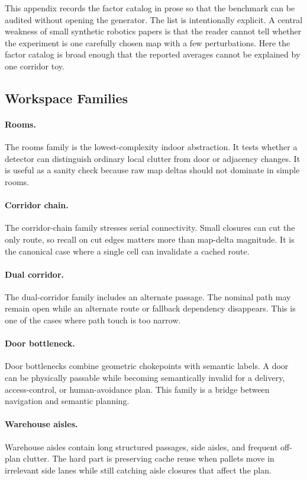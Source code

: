 \documentclass{article}
\begin{document}
This appendix records the factor catalog in prose so that the benchmark can be audited without opening the generator. The list is intentionally explicit. A central weakness of small synthetic robotics papers is that the reader cannot tell whether the experiment is one carefully chosen map with a few perturbations. Here the factor catalog is broad enough that the reported averages cannot be explained by one corridor toy.

\subsection{Workspace Families}

\paragraph{Rooms.}
The rooms family is the lowest-complexity indoor abstraction. It tests whether a detector can distinguish ordinary local clutter from door or adjacency changes. It is useful as a sanity check because raw map deltas should not dominate in simple rooms.

\paragraph{Corridor chain.}
The corridor-chain family stresses serial connectivity. Small closures can cut the only route, so recall on cut edges matters more than map-delta magnitude. It is the canonical case where a single cell can invalidate a cached route.

\paragraph{Dual corridor.}
The dual-corridor family includes an alternate passage. The nominal path may remain open while an alternate route or fallback dependency disappears. This is one of the cases where path touch is too narrow.

\paragraph{Door bottleneck.}
Door bottlenecks combine geometric chokepoints with semantic labels. A door can be physically passable while becoming semantically invalid for a delivery, access-control, or human-avoidance plan. This family is a bridge between navigation and semantic planning.

\paragraph{Warehouse aisles.}
Warehouse aisles contain long structured passages, side aisles, and frequent off-plan clutter. The hard part is preserving cache reuse when pallets move in irrelevant side lanes while still catching aisle closures that affect the plan.
\end{document}

